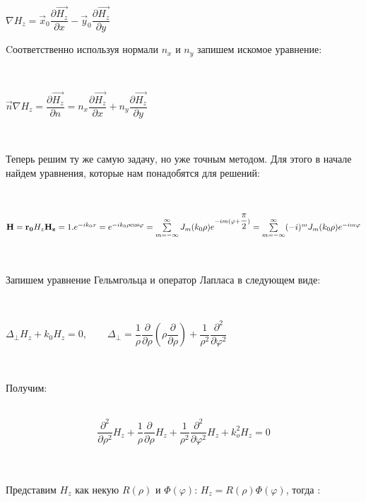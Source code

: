 \begin{center}
	$ \nabla H_{z} = \vec{x}_{0} \dfrac{\partial\vec{H_{z}}}{\partial x} - \vec{y}_{0}
	\dfrac{\partial\vec{H_{z}}}{\partial y} $
	\\
\end{center}
\begin{flushleft}
	Cоответственно используя нормали $n_{x}$ и $n_{y}$  запишем искомое уравнение:
\end{flushleft} \\
\begin{center}
	$ \vec{n}\nabla H_{z} = \dfrac{\partial\vec{H_{z}}}{\partial n} = 
	n_{x}\dfrac{\partial\vec{H_{z}}}{\partial x} +
	n_{y}\dfrac{\partial\vec{H_{z}}}{\partial y} $
\end{center}

 \\
\begin{flushleft}
	Теперь решим ту же самую задачу, но уже точным методом. Для этого в начале найдем уравнения, которые нам понадобятся для решений:
\end{flushleft}\\

\begin{center}
	$ \vec{H} = \vec{r_{0}}H_{z}
\vec{H_{z}} = 1.e^{-ik_{0}x} = e^{-ik_{0}\rho \rm cos\varphi} = 
\sum\limits_{m=-\infty}^{\infty} J_{m}(k_{0}\rho)e^{-im(\varphi + \dfrac{\pi}{2})} =
\sum\limits_{m=-\infty}^{\infty} (-i)^{m}J_{m}(k_{0}\rho)e^{-im\varphi}
$
\end{center}\\

\begin{flushleft}
	Запишем уравнение Гельмгольца и оператор Лапласа в следующем виде:
\end{flushleft} \\
\begin{center}
	$ 
	\Delta_{\perp}H_{z} + k_{0}H_{z} = 0, \qquad
	\Delta_{\perp} = \dfrac{1}{\rho}
	\dfrac{\partial}{\partial \rho} 
	(\rho \dfrac{\partial}{\partial \rho}) + 
	\dfrac{1}{\rho^{2}}
	\dfrac{\partial^{2}}{\partial \varphi^{2}} 
	$
\end{center}
\\
\begin{flushleft}
	Получим:
\end{flushleft} \\
$$ \dfrac{\partial^{2}}{\partial \rho^{2}}H_{z}  +
\dfrac{1}{\rho}\dfrac{\partial}{\partial \rho}H_{z} +
\dfrac{1}{\rho^{2}}\dfrac{\partial^{2}}{\partial \varphi^{2}}H_{z}+
k_{o}^{2}H_{z} = 0 $$
\\
\begin{flushleft}\\
	
	Представим $ H_{z} $ как некую $ R(\rho) $ и $ \Phi(\varphi) $:\quad
	$ H_{z} = R(\rho)\Phi(\varphi) $, \qquad тогда : \\
\end{flushleft}

